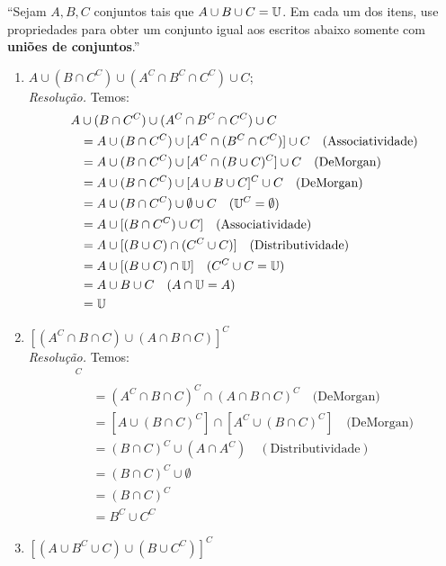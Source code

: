 \enquote{Sejam $A, B, C$ conjuntos tais que $A \cup B \cup C = \mathbb U$. Em cada um dos itens, use propriedades para obter um conjunto igual aos escritos abaixo somente com \textbf{uniões de conjuntos}.}
\begin{enumerate}
    \item $A \cup (B \cap C^C) \cup (A^C \cap B^C \cap C^C) \cup C$; \\
    \emph{Resolução.} Temos:
    \begin{align*}
       A &\cup (B \cap C^C) \cup (A^C \cap B^C \cap C^C) \cup C \\ &=
       A \cup (B \cap C^C) \cup [A^C \cap (B^C \cap C^C)] \cup C \quad \text{(Associatividade)} \\ &=
       A \cup (B \cap C^C) \cup [A^C \cap (B \cup C)^C] \cup C \quad \text{(DeMorgan)} \\ &=
       A \cup (B \cap C^C) \cup [A \cup B \cup C]^C \cup C \quad \text{(DeMorgan)} \\ &=
       A \cup (B \cap C^C) \cup \emptyset \cup C \quad (\mathbb U^C = \emptyset) \\ &= 
       A \cup [(B \cap C^C) \cup C] \quad \text{(Associatividade)} \\ &=
       A \cup [(B \cup C) \cap (C^C \cup C)] \quad \text{(Distributividade)} \\ &=
       A \cup [(B \cup C) \cap \mathbb U] \quad (C^C \cup C = \mathbb U) \\ &=
       A \cup B \cup C \quad (A \cap \mathbb U = A) \\ &=
       \mathbb U
    \end{align*}
    \item $[(A^C \cap B \cap C) \cup (A \cap B \cap C)]^C$ \\
    \emph{Resolução.} Temos:
    \begin{align*}
        [(A^C &\cap B \cap C) \cup (A \cap B \cap C)]^C\\ &=
        (A^C \cap B \cap C)^C \cap (A \cap B \cap C)^C \quad \text{(DeMorgan)} \\ &=
        [A \cup (B \cap C)^C] \cap [A^C \cup (B \cap C)^C] \quad \text{(DeMorgan)} \\ &=
        (B \cap C)^C \cup (A \cap A^C) \quad (\text{Distributividade}) \\ &=
        (B \cap C)^C \cup \emptyset \\ &=
        (B \cap C)^C \\ &=
        B^C \cup C^C
     \end{align*}
    \item $[(A \cup B^C \cup C) \cup (B \cup C^C)]^C$ \\ 

\end{enumerate}
